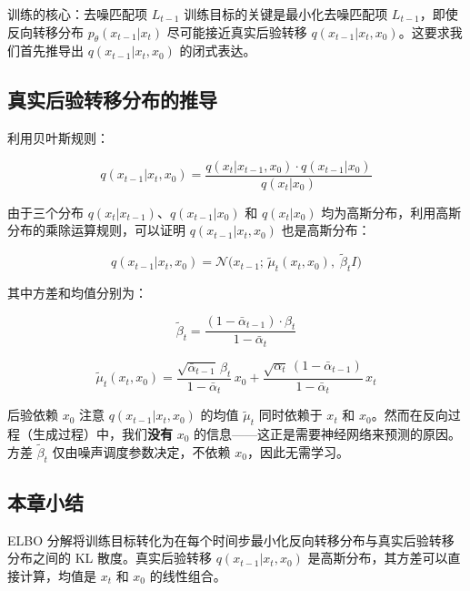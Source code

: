 \begin{importantbox}{训练的核心：去噪匹配项 $L_{t-1}$}
训练目标的关键是最小化去噪匹配项 $L_{t-1}$，即使反向转移分布 $p_\theta(x_{t-1}|x_t)$ 尽可能接近真实后验转移 $q(x_{t-1}|x_t, x_0)$。这要求我们首先推导出 $q(x_{t-1}|x_t, x_0)$ 的闭式表达。
\end{importantbox}

\subsection{真实后验转移分布的推导}

利用贝叶斯规则：

$$q(x_{t-1}|x_t, x_0) = \frac{q(x_t|x_{t-1}, x_0) \cdot q(x_{t-1}|x_0)}{q(x_t|x_0)}$$

由于三个分布 $q(x_t|x_{t-1})$、$q(x_{t-1}|x_0)$ 和 $q(x_t|x_0)$ 均为高斯分布，利用高斯分布的乘除运算规则，可以证明 $q(x_{t-1}|x_t, x_0)$ 也是高斯分布：

$$q(x_{t-1}|x_t, x_0) = \mathcal{N}\big(x_{t-1};\, \tilde{\mu}_t(x_t, x_0),\; \tilde{\beta}_t I\big)$$

其中方差和均值分别为：

$$\tilde{\beta}_t = \frac{(1 - \bar{\alpha}_{t-1}) \cdot \beta_t}{1 - \bar{\alpha}_t}$$

$$\tilde{\mu}_t(x_t, x_0) = \frac{\sqrt{\bar{\alpha}_{t-1}}\, \beta_t}{1 - \bar{\alpha}_t}\, x_0 + \frac{\sqrt{\alpha_t}\, (1 - \bar{\alpha}_{t-1})}{1 - \bar{\alpha}_t}\, x_t$$

\begin{warningbox}{后验依赖 $x_0$}
注意 $q(x_{t-1}|x_t, x_0)$ 的均值 $\tilde{\mu}_t$ 同时依赖于 $x_t$ 和 $x_0$。然而在反向过程（生成过程）中，我们\textbf{没有} $x_0$ 的信息——这正是需要神经网络来预测的原因。方差 $\tilde{\beta}_t$ 仅由噪声调度参数决定，不依赖 $x_0$，因此无需学习。
\end{warningbox}

\subsection{本章小结}

ELBO 分解将训练目标转化为在每个时间步最小化反向转移分布与真实后验转移分布之间的 KL 散度。真实后验转移 $q(x_{t-1}|x_t, x_0)$ 是高斯分布，其方差可以直接计算，均值是 $x_t$ 和 $x_0$ 的线性组合。


